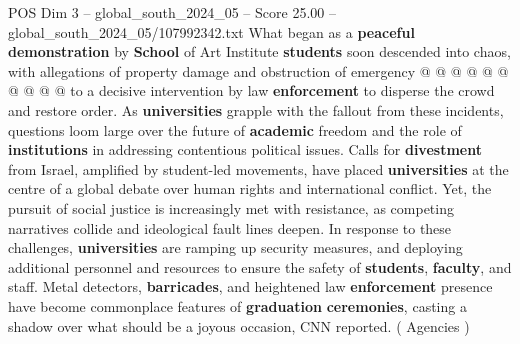 \begin{textsample}{POS Dim 3 – global\_south\_2024\_05 – Score 25.00 – global\_south\_2024\_05/107992342.txt}
What began as a \textbf{peaceful} \textbf{demonstration} by \textbf{School} of Art Institute \textbf{students} soon descended into chaos, with allegations of property damage and obstruction of emergency @ @ @ @ @ @ @ @ @ @ to a decisive intervention by law \textbf{enforcement} to disperse the crowd and restore order.
As \textbf{universities} grapple with the fallout from these incidents, questions loom large over the future of \textbf{academic} freedom and the role of \textbf{institutions} in addressing contentious political issues.
Calls for \textbf{divestment} from Israel, amplified by student-led movements, have placed \textbf{universities} at the centre of a global debate over human rights and international conflict.
Yet, the pursuit of social justice is increasingly met with resistance, as competing narratives collide and ideological fault lines deepen.
In response to these challenges, \textbf{universities} are ramping up security measures, and deploying additional personnel and resources to ensure the safety of \textbf{students}, \textbf{faculty}, and staff.
Metal detectors, \textbf{barricades}, and heightened law \textbf{enforcement} presence have become commonplace features of \textbf{graduation} \textbf{ceremonies}, casting a shadow over what should be a joyous occasion, CNN reported. ( Agencies )

\end{textsample}
